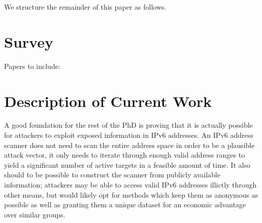 \documentclass[10pt,sigconf]{acmart}
\begin{document}
We structure the remainder of this paper as follows.

%
%
\section{Survey}

Papers to include:



\section{Description of Current Work}


A good foundation for the rest of the PhD is proving that it is actually possible for attackers to exploit exposed information in IPv6 addresses.
An IPv6 address scanner does not need to scan the entire address space in order to be a plausible attack vector, it only needs to iterate through enough valid address ranges to yield a significant number of active targets in a feasible amount of time.
It also should to be possible to construct the scanner from publicly available information; 
attackers may be able to access valid IPv6 addresses illictly through other means, but would likely opt for methods which keep them as anonymous as possible as well as granting them a unique dataset for an economic advantage over similar groups.
\end{document}
